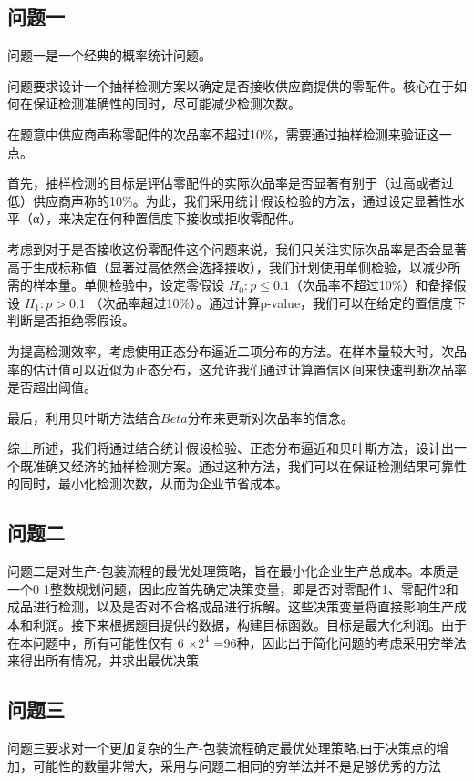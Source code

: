 \documentclass[withoutpreface,bwprint]{cumcmthesis}
\begin{document}
\subsection{问题一}
问题一是一个经典的概率统计问题。

问题要求设计一个抽样检测方案以确定是否接收供应商提供的零配件。核心在于如何在保证检测准确性的同时，尽可能减少检测次数。

在题意中供应商声称零配件的次品率不超过10\%，需要通过抽样检测来验证这一点。

首先，抽样检测的目标是评估零配件的实际次品率是否显著有别于（过高或者过低）供应商声称的10\%。为此，我们采用统计假设检验的方法，通过设定显著性水平（α），来决定在何种置信度下接收或拒收零配件。

考虑到对于是否接收这份零配件这个问题来说，我们只关注实际次品率是否会显著高于生成标称值（显著过高依然会选择接收），我们计划使用单侧检验，以减少所需的样本量。单侧检验中，设定零假设 $H_0: p \leq 0.1 $（次品率不超过10\%）和备择假设 $H_1: p > 0.1$ （次品率超过10\%）。通过计算p-value，我们可以在给定的置信度下判断是否拒绝零假设。

为提高检测效率，考虑使用正态分布逼近二项分布的方法。在样本量较大时，次品率的估计值可以近似为正态分布，这允许我们通过计算置信区间来快速判断次品率是否超出阈值。

最后，利用贝叶斯方法结合$Beta$分布来更新对次品率的信念。

综上所述，我们将通过结合统计假设检验、正态分布逼近和贝叶斯方法，设计出一个既准确又经济的抽样检测方案。通过这种方法，我们可以在保证检测结果可靠性的同时，最小化检测次数，从而为企业节省成本。


\subsection{问题二}
问题二是对生产-包装流程的最优处理策略，旨在最小化企业生产总成本。本质是一个0-1整数规划问题，因此应首先确定决策变量，即是否对零配件1、零配件2和成品进行检测，以及是否对不合格成品进行拆解。这些决策变量将直接影响生产成本和利润。接下来根据题目提供的数据，构建目标函数。目标是最大化利润。由于在本问题中，所有可能性仅有 6 $\times 2^{4}$ =96种，因此出于简化问题的考虑采用穷举法来得出所有情况，并求出最优决策

\subsection{问题三}
问题三要求对一个更加复杂的生产-包装流程确定最优处理策略,由于决策点的增加，可能性的数量非常大，采用与问题二相同的穷举法并不是足够优秀的方法
\end{document}
